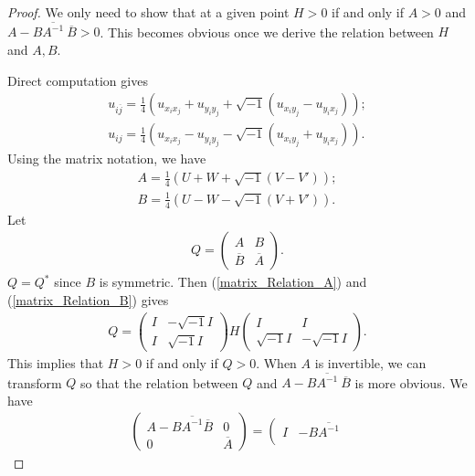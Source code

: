 \documentclass[10pt,a4paper]{amsart}
\newcommand{\ijbar}{{i\overline j}}
\begin{document}
\begin{proof}
	We only need to show that at a given point $H>0$  if and only if $A>0$ and $A-B\overline{A^{-1}}\ \overline B>0$. This becomes  obvious once we derive the relation between $H$ and $A, B$.
	
	Direct computation gives
	\begin{align}
		u_{\ijbar}=\frac{1}{4}\left(u_{x_ix_j}+u_{y_iy_j}+\sqrt{-1}(u_{x_iy_j}-u_{y_ix_j})\right);\\
			u_{ij}=\frac{1}{4}\left(u_{x_ix_j}-u_{y_iy_j}-\sqrt{-1}(u_{x_iy_j}+u_{y_ix_j})\right).
	\end{align}Using the matrix notation, we have
	\begin{align}
		\label{matrix_Relation_A}
		A=\frac{1}{4}(U+W+\sqrt{-1}(V-V'));\\
				\label{matrix_Relation_B}
		B=\frac{1}{4}(U-W-\sqrt{-1}(V+V')).
	\end{align}
	  Let
	  \begin{align}
	  	Q=\left(
	  	\begin{array}{cc}
	  	A	&  B    \\
	  	\overline{B}	&\overline{A}
	  	\end{array}
	  	\right).
	  \end{align}
	  $Q=Q^\ast$ since $B$ is symmetric. 
	  Then (\ref{matrix_Relation_A}) and (\ref{matrix_Relation_B}) gives
	  \begin{align}
	  	\label{QH}
	  	Q=\left(
	  	\begin{array}{cc}
	  	I	&  -\sqrt{-1}I   \\
	  	I	&   \sqrt{-1}I
	  	\end{array}
	  	\right)  H
	  	\left(
	  	\begin{array}{cc}
	  		I	& I   \\
	  	 \sqrt{-1}	I	&  - \sqrt{-1}I
	  	\end{array}
	  	\right).
	  \end{align}
	  This implies that $H>0$ if and only if $Q>0$. When $A$ is invertible, we can transform $Q$ so that the relation between $Q$ and $A-B\overline{A^{-1}}\ \overline{B}$ is more obvious. We have
	  \begin{align}
	  	\left(\begin{array}{cc}
	  		A-B\overline{A^{-1}}\overline{B}& 0\\
	  		0& \overline{A}
	  	\end{array}\right)
	  	=\left(\begin{array}{cc}
	  		I& -B\overline{A^{-1}}\\

\end{array}
\end{align}
\end{proof}
\end{document}
